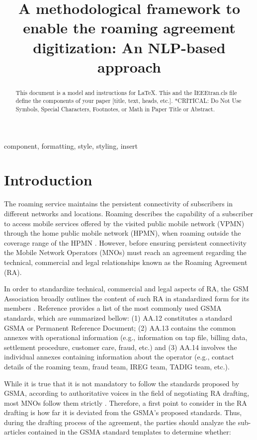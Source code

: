 \documentclass[conference]{style/IEEEtran}
\begin{document}
\title{A methodological framework to enable the roaming agreement digitization: An NLP-based approach\\}

\maketitle

\begin{abstract}
This document is a model and instructions for \LaTeX.
This and the IEEEtran.cls file define the components of your paper [title, text, heads, etc.]. *CRITICAL: Do Not Use Symbols, Special Characters, Footnotes, 
or Math in Paper Title or Abstract.
\end{abstract}

\begin{IEEEkeywords}
component, formatting, style, styling, insert
\end{IEEEkeywords}

\section{Introduction}
The roaming service maintains the persistent connectivity of subscribers in different networks and locations. Roaming describes the capability of a subscriber to access mobile services offered by the visited public mobile network (VPMN) through the home public mobile network (HPMN), when roaming outside the coverage range of the HPMN \cite{b1}. However, before ensuring persistent connectivity the Mobile Network Operators (MNOs) must reach an agreement regarding the technical, commercial and legal relationships known as the Roaming Agreement (RA).

In order to standardize technical, commercial and legal aspects of RA, the GSM Association broadly outlines the content of such RA in standardized form for its members \cite{b2}. Reference \cite{b3} provides a list of the most commonly used GSMA standards, which are summarized bellow: (1) AA.12 constitutes a standard GSMA or Permanent Reference Document; (2) AA.13 contains the common annexes with operational information (e.g., information on tap file, billing data, settlement procedure, customer care, fraud, etc.) and (3) AA.14 involves the individual annexes containing information about the operator (e.g., contact details of the roaming team, fraud team, IREG team, TADIG team, etc.).

While it is true that it is not mandatory to follow the standards proposed by GSMA, according to authoritative voices in the field of negotiating RA drafting, most MNOs follow them strictly \cite{b4}. Therefore, a first point to consider in the RA drafting is how far it is deviated from the GSMA's proposed standards. Thus, during the drafting process of the agreement, the parties should analyze the sub-articles contained in the GSMA standard templates to determine whether:
\end{document}
